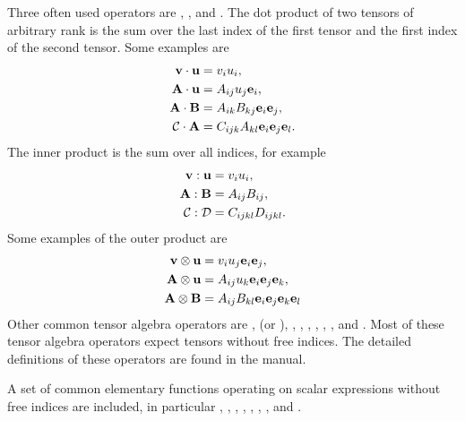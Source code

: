 Three often used operators are , ,
and .  The dot product of two tensors of arbitrary
rank is the sum over the last index of the first tensor and the first
index of the second tensor.  Some examples are
\begin{align}
\mathbf{v} \cdot \mathbf{u} &= v_i u_i, \\
\mathbf{A} \cdot \mathbf{u} &= A_{ij} u_j \mathbf{e}_i, \\
\mathbf{A} \cdot \mathbf{B} &= A_{ik} B_{kj} \mathbf{e}_i \mathbf{e}_j, \\
\mathcal{C} \cdot \mathbf{A} &= C_{ijk} A_{kl} \mathbf{e}_i \mathbf{e}_j \mathbf{e}_l.
\end{align}
The inner product is the sum over all indices, for example
\begin{align}
\mathbf{v} : \mathbf{u} &= v_i u_i, \\
\mathbf{A} : \mathbf{B} &= A_{ij} B_{ij}, \\
\mathcal{C} : \mathcal{D} &= C_{ijkl} D_{ijkl}.
\end{align}
Some examples of the outer product are
\begin{align}
\mathbf{v} \otimes \mathbf{u} &= v_i u_j \mathbf{e}_i \mathbf{e}_j, \\
\mathbf{A} \otimes \mathbf{u} &= A_{ij} u_k \mathbf{e}_i \mathbf{e}_j \mathbf{e}_k, \\
\mathbf{A} \otimes \mathbf{B} &= A_{ij} B_{kl} \mathbf{e}_i \mathbf{e}_j \mathbf{e}_k \mathbf{e}_l
\end{align}
Other common tensor algebra operators are ,
 (or ), , ,
, , , , and
. Most of these tensor algebra operators expect tensors
without free indices. The detailed definitions of these operators are
found in the manual.

A set of common elementary functions operating on scalar expressions
without free indices are included, in particular ,
, , , ,
, , and .

